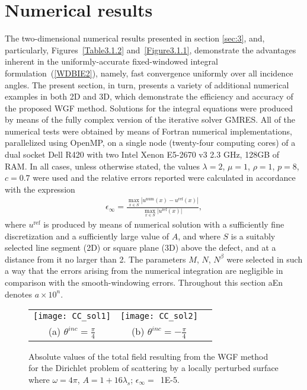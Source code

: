 \documentclass[10pt]{article}
\numberwithin{equation}{section}
\newcommand{\be}{\begin{eqnarray}}
\newcommand{\en}{\end{eqnarray}}
\begin{document}
\section{Numerical results}
\label{sec:5}

The two-dimensional numerical results presented in section
\ref{sec:3}, and, particularly, Figures~\ref{Table3.1.2}
and~\ref{Figure3.1.1}, demonstrate the advantages inherent in the
uniformly-accurate fixed-windowed integral formulation~(\ref{WDBIE2}),
namely, fast convergence uniformly over all incidence angles. The
present section, in turn, presents a variety of additional numerical
examples in both 2D and 3D, which demonstrate the efficiency and
accuracy of the proposed WGF method. Solutions for the integral
equations were produced by means of the fully complex version of the
iterative solver GMRES. All of the numerical tests were obtained by
means of Fortran numerical implementations, parallelized using OpenMP,
on a single node (twenty-four computing cores) of a dual socket Dell
R420 with two Intel Xenon E5-2670 v3 2.3 GHz, 128GB of RAM. In all
cases, unless otherwise stated, the values $\lambda=2$, $\mu=1$,
$\rho=1$, $p=8$, $c=0.7$ were used and the relative errors reported
were calculated in accordance with the expression \be\label{rel_error}
\epsilon_\infty=\frac{\max_{x\in
    S}|u^{\mbox{num}}(x)-u^{\mbox{ref}}(x)|}{\max_{x\in
    S}|u^{\mbox{ref}}(x)|}, \en where $u^{\mbox{ref}}$ is produced by
means of numerical solution with a sufficiently fine discretization
and a sufficiently large value of $A$, and where $S$ is a suitably
selected line segment (2D) or square plane (3D) above the defect, and
at a distance from it no larger than 2.  The parameters $M$, $N$,
$N^\beta$ were selected in such a way that the errors arising from the
numerical integration are negligible in comparison with the
smooth-windowing errors. Throughout this section aEn denotes
$a\times10^{n}$.

\begin{figure}[htbp]
\centering
\begin{tabular}{ccc}
\texttt{[image: CC\_sol1]} &
\texttt{[image: CC\_sol2]} \\
(a) $\theta^{inc}=\frac{\pi}{4}$ & (b) $\theta^{inc}=-\frac{\pi}{4}$ \\
\end{tabular}
\caption{Absolute values of the total field  resulting from the WGF method for the Dirichlet problem of scattering by a locally perturbed surface where $\omega=4\pi$, $A=1+16\lambda_s$; $\epsilon_\infty = $~1E-5.}
\label{Figure2D.4}
\end{figure}
\end{document}
